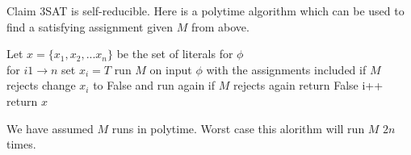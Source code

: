 \documentclass{article}
\begin{document}
Claim 3SAT is self-reducible. Here is a polytime algorithm which can be used to find a satisfying assignment given $M$ from above.

Let $x = \{x_1, x_2, ... x_n\}$ be the set of literals for $\phi$\\

for $i 1 \rightarrow n$
\hspace{10mm}set $x_i = T$
\hspace{10mm}run $M$ on input $\phi$ with the assignments included
\hspace{10mm}if $M$ rejects change $x_i$ to False and run again
\hspace{20mm}if $M$ rejects again return False
\hspace{10mm}i++
return $x$

We have assumed $M$ runs in polytime. Worst case this alorithm will run $M$ $2n$ times.
\end{document}
